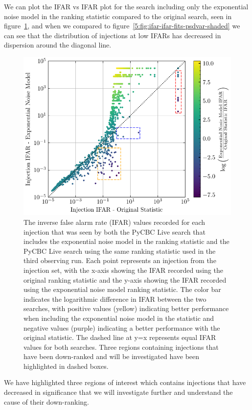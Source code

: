 We can plot the IFAR vs IFAR plot for the search including only the exponential noise model in the ranking statistic compared to the original search, seen in figure~\ref{5:fig:ifar-ifar-fits-only-regions}, and when we compared to figure~\ref{5:fig:ifar-ifar-fits-psdvar-shaded} we can see that the distribution of injections at low IFARs has decreased in dispersion around the diagonal line.
% 
\begin{figure}
       \centering
    \includegraphics[width=1.0\textwidth]{images/5_pycbclive/fits-only/fits_only_ifar_vs_ifar_regions.pdf}
    \caption{The inverse false alarm rate (IFAR) values recorded for each injection that was seen by both the PyCBC Live search that includes the exponential noise model in the ranking statistic and the PyCBC Live search using the same ranking statistic used in the third observing run. Each point represents an injection from the injection set, with the x-axis showing the IFAR recorded using the original ranking statistic and the y-axis showing the IFAR recorded using the exponential noise model ranking statistic. The color bar indicates the logarithmic difference in IFAR between the two searches, with positive values (yellow) indicating better performance when including the exponential noise model in the statistic and negative values (purple) indicating a better performance with the original statistic. The dashed line at y=x represents equal IFAR values for both searches. Three regions containing injections that have been down-ranked and will be investigated have been highlighted in dashed boxes.}
    \label{5:fig:ifar-ifar-fits-only-regions}
\end{figure}
%
We have highlighted three regions of interest which contains injections that have decreased in significance that we will investigate further and understand the cause of their down-ranking.

